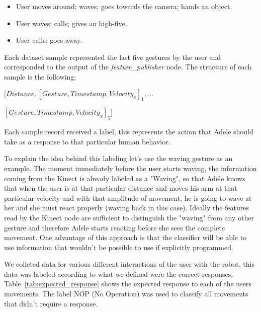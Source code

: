 \begin{itemize}
\item User moves around; waves; goes towards the camera; hands an object.
\item User waves; calls; gives an high-five.
\item User calls; goes away.
\end{itemize}

Each dataset sample represented the last five gestures by the user and corresponded to the output of the \textit{feature\_publisher} node. The structure of each sample is the following:

\vspace*{4pt}
$\Big[Distance, [Gesture, Timestamp, Velocity_x]_1,...$

$[Gesture, Timestamp, Velocity_x]_5\Big]$
\vspace*{4pt}

Each sample record received a label, this represents the action that Adele should take as a response to that particular human behavior.

To explain the idea behind this labeling let's use the waving gesture as an example. The moment immediately before the user starts waving, the information coming from the Kinect is already labeled as a "Waving", so that Adele knows that when the user is at that particular distance and moves his arm at that particular velocity and with that amplitude of movement, he is going to wave at her and she must react properly (waving back in this case). Ideally the features read by the Kinect node are sufficient to distinguish the "waving" from any other gesture and therefore Adele starts reacting before she sees the complete movement. One advantage of this approach is that the classifier will be able to use information that wouldn't be possible to use if explicitly programmed.

We colleted data for various different interactions of the user with the robot, this data was labeled according to what we defined were the correct responses. Table~\ref{tab:expected_response} shows the expected response to each of the users movements. The label NOP (No Operation) was used to classify all movements that didn't require a response.

